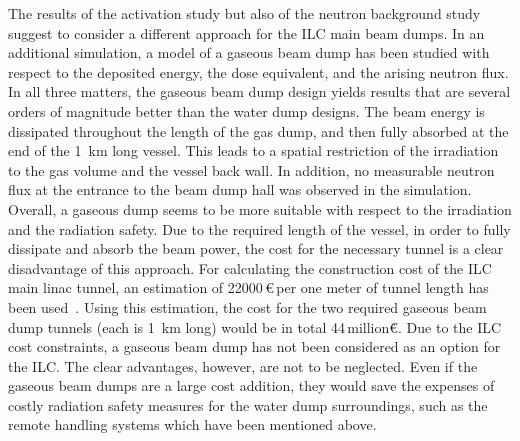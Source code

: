 The results of the activation study but also of the neutron background study suggest to consider a different approach for the ILC main beam dumps.
In an additional \fluka simulation, a model of a gaseous beam dump has been studied with respect to the deposited energy, the dose equivalent, and the arising neutron flux.
In all three matters, the gaseous beam dump design yields results that are several orders of magnitude better than the water dump designs.
The beam energy is dissipated throughout the length of the gas dump, and then fully absorbed at the end of the \SI{1}{\kilo\meter} long vessel.
This leads to a spatial restriction of the irradiation to the gas volume and the vessel back wall.
In addition, no measurable neutron flux at the entrance to the beam dump hall was observed in the \fluka simulation.
\\Overall, a gaseous dump seems to be more suitable with respect to the irradiation and the radiation safety.
Due to the required length of the vessel, in order to fully dissipate and absorb the beam power, the cost for the necessary tunnel is a clear disadvantage of this approach.
For calculating the construction cost of the ILC main linac tunnel, an estimation of \num{22000}\,\euro\,per one meter of tunnel length has been used~\cite{TunnelCost}.
Using this estimation, the cost for the two required gaseous beam dump tunnels (each is \SI{1}{\kilo\meter} long) would be in total \num{44}\,million\.\euro.
Due to the ILC cost constraints, a gaseous beam dump has not been considered as an option for the ILC.
The clear advantages, however, are not to be neglected.
Even if the gaseous beam dumps are a large cost addition, they would save the expenses of costly radiation safety measures for the water dump surroundings, such as the remote handling systems which have been mentioned above.